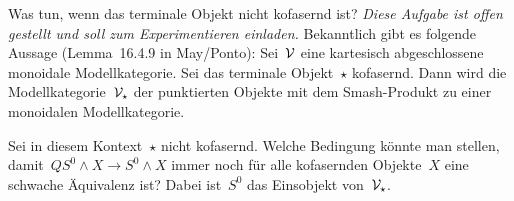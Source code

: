 \documentclass{uebblatt}
\begin{document}

\begin{aufgabe}{Was tun, wenn das terminale Objekt nicht kofasernd ist?}
\emph{Diese Aufgabe ist offen gestellt und soll zum Experimentieren einladen.}
Bekanntlich gibt es folgende Aussage (Lemma~16.4.9 in May/Ponto): Sei~$\mathcal{V}$ eine
kartesisch abgeschlossene monoidale Modellkategorie. Sei das terminale
Objekt~$\star$ kofasernd. Dann wird die Modellkategorie~$\mathcal{V}_\star$ der punktierten
Objekte mit dem Smash-Produkt zu einer monoidalen Modellkategorie.

Sei in diesem Kontext~$\star$ nicht kofasernd. Welche Bedingung könnte man
stellen, damit~$QS^0 \wedge X \to S^0 \wedge X$ immer noch für alle kofasernden
Objekte~$X$ eine schwache Äquivalenz ist? Dabei ist~$S^0$ das Einsobjekt
von~$\mathcal{V}_\star$.
\end{aufgabe}
\end{document}
